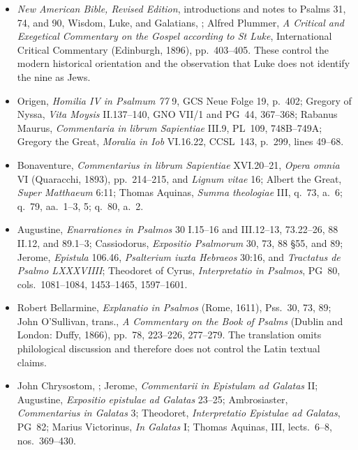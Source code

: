 {\begin{itemize}[itemsep=0em,topsep=0.15em,parsep=0pt]
\item \emph{New American Bible, Revised Edition}, introductions and notes to
Psalms 31, 74, and 90, Wisdom, Luke, and Galatians,
; Alfred
Plummer, \emph{A Critical and Exegetical Commentary on the Gospel according
to St Luke}, International Critical Commentary (Edinburgh, 1896),
pp.~403--405. These control the modern historical orientation and the
observation that Luke does not identify the nine as Jews.

\item Origen, \emph{Homilia IV in Psalmum 77} 9, GCS Neue Folge 19,
p.~402; Gregory of Nyssa, \emph{Vita Moysis} II.137--140, GNO VII/1 and
PG~44, 367--368; Rabanus Maurus, \emph{Commentaria in librum Sapientiae}
III.9, PL~109, 748B--749A; Gregory the Great, \emph{Moralia in Iob}
VI.16.22, CCSL~143, p.~299, lines 49--68.

\item Bonaventure, \emph{Commentarius in librum Sapientiae} XVI.20--21,
\emph{Opera omnia} VI (Quaracchi, 1893), pp.~214--215, and \emph{Lignum
vitae} 16; Albert the Great, \emph{Super Matthaeum} 6:11; Thomas Aquinas,
\emph{Summa theologiae} III, q.~73, a.~6; q.~79, aa.~1--3, 5; q.~80, a.~2.

\item Augustine, \emph{Enarrationes in Psalmos} 30 I.15--16 and III.12--13,
73.22--26, 88 II.12, and 89.1--3; Cassiodorus, \emph{Expositio Psalmorum}
30, 73, 88 \S55, and 89; Jerome, \emph{Epistula} 106.46,
\emph{Psalterium iuxta Hebraeos} 30:16, and \emph{Tractatus de Psalmo
LXXXVIIII}; Theodoret of Cyrus, \emph{Interpretatio in Psalmos}, PG~80,
cols.~1081--1084, 1453--1465, 1597--1601.

\item Robert Bellarmine, \emph{Explanatio in Psalmos} (Rome, 1611),
Pss.~30, 73, 89; John O'Sullivan, trans., \emph{A Commentary on the Book of
Psalms} (Dublin and London: Duffy, 1866), pp.~78, 223--226, 277--279. The
translation omits philological discussion and therefore does not control the
Latin textual claims.

\item John Chrysostom,
; Jerome, \emph{Commentarii in Epistulam ad Galatas} II;
Augustine, \emph{Expositio epistulae ad Galatas} 23--25; Ambrosiaster,
\emph{Commentarius in Galatas} 3; Theodoret, \emph{Interpretatio Epistulae
ad Galatas}, PG~82; Marius Victorinus, \emph{In Galatas} I; Thomas Aquinas,
III, lects.~6--8, nos.~369--430.


\end{itemize}}
